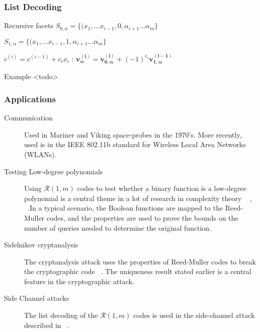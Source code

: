 \documentclass[xcolor=xvgnames]{beamer}
\newcommand{\RM}[2]{\ensuremath{\mathcal{R}(#1,#2)}}
\newcommand{\rem}{Reed-Muller}
\newcommand{\V}[1]{\ensuremath{\mathbf{#1}}}
\begin{document}
\begin{frame}
  \frametitle{List Decoding}
\begin{block}{Recursive facets}
$S_{0,\alpha} =  \{(x_1,\ldots x_{i-1},0, \alpha_{i+1}\ldots \alpha_{m} \} $

$ S_{1,\alpha} =  \{(x_1,\ldots x_{i-1},1, \alpha_{i+1}\ldots \alpha_{m} \} $
 \end{block}

$c^{(i)} = c^{(i-1)}+ c_ix_i$ :
$  \V{v_\alpha^{(i)}} = \V{v_{0,\alpha}^{(i)}} + (-1)^{c_i}\V{v_{1,\alpha}^{(i-1)}} $


  \begin{block}{Example}
<todo>
\end{block}


\end{frame}


\begin{frame}
  \frametitle{Applications}
  \begin{description}

\item[Communication]
Used in Mariner and Viking space-probes in the 1970's.
More recently, used is in the IEEE 802.11b standard for Wireless Local Area Networks (WLANs).

\item[Testing Low-degree polynomials]
Using $\RM{1}{m}$ codes to test whether a binary function is a low-degree polynomial is a central theme in a lot of research in complexity theory ~\cite{lowdeg} , ~\cite{local+testing}.In a typical scenario, the Boolean functions are mapped to the \rem{} codes, and the properties are used to prove the bounds on the number of queries needed to determine the original function.

\item[Sidelnikov cryptanalysis]
The cryptanalysis attack uses the properties of \rem{} codes to break the cryptographic code ~\cite{attack}. The uniqueness result stated earlier is a central feature in the cryptographic attack.~\cite{correlation}

\item[Side Channel attacks]
The list decoding of the $\RM{1}{m}$ codes is used in the side-channel attack described in ~\cite{roche}.

  \end{description}

\end{frame}
\end{document}
